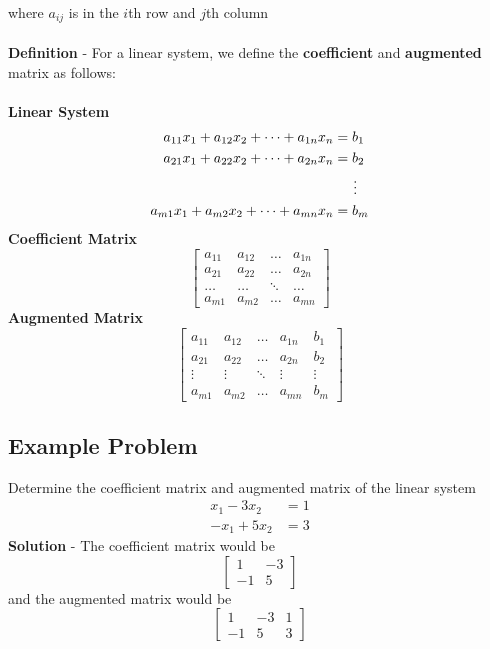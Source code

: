 where $a_{ij}$ is in the $i$th row and $j$th column \\\\
\textbf{Definition} - For a linear system, we define the \textbf{coefficient} and \textbf{augmented} matrix as follows: \\\\
\textbf{Linear System}
\[
  \begin{aligned}
    a_{11}x_{1} + a_{12}x_{2} + \dots + a_{1n}x_n &= b_1 \\
    a_{21}x_{1} + a_{22}x_{2} + \dots + a_{2n}x_n &= b_2 \\
                                                  &\hspace{0.5cm} \vdots \\
    a_{m1}x_{1} + a_{m2}x_{2} + \dots + a_{mn}x_n &= b_m
  \end{aligned}
\]
\textbf{Coefficient Matrix}
\[
  \begin{bmatrix}
    a_{11} & a_{12} & \dots & a_{1n} \\
    a_{21} & a_{22} & \dots & a_{2n} \\
    \dots & \dots & \ddots & \dots \\
    a_{m1} & a_{m2} & \dots & a_{mn}
  \end{bmatrix}
\]
\textbf{Augmented Matrix}
\[
\left[
\begin{array}{cccc|c}
  a_{11} & a_{12} & \dots & a_{1n} & b_1 \\
  a_{21} & a_{22} & \dots & a_{2n} & b_2 \\
  \vdots & \vdots & \ddots & \vdots & \vdots \\
  a_{m1} & a_{m2} & \dots & a_{mn} & b_m
\end{array}
\right]
\]
\subsection{Example Problem}
Determine the coefficient matrix and augmented matrix of the linear system
\[
  \begin{aligned}  
  x_1 - 3x_2 &= 1 \\
  -x_1 + 5x_2 &= 3
  \end{aligned}
\]
\textbf{Solution} - The coefficient matrix would be
\[
  \begin{bmatrix}
    1 & -3 \\
    -1 & 5
  \end{bmatrix}
\]
and the augmented matrix would be
\[
  \left[
  \begin{array}{cc|c}
    1 & -3 & 1 \\
    -1 & 5 & 3
  \end{array}
\right]
\]
